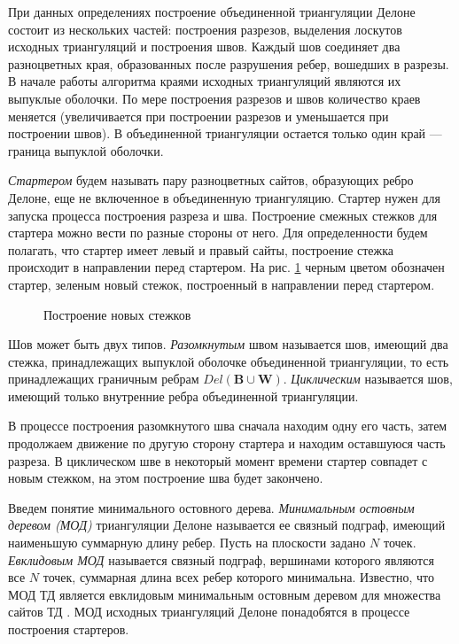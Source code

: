 \documentclass[12pt]{article}
\begin{document}
При данных определениях построение объединенной триангуляции Делоне состоит из нескольких частей: построения разрезов,
выделения лоскутов исходных триангуляций и построения швов.
Каждый шов соединяет два разноцветных края, образованных после разрушения ребер, вошедших в разрезы.
В начале работы алгоритма краями исходных триангуляций являются их выпуклые оболочки.
По мере построения разрезов и швов количество краев меняется
(увеличивается при построении разрезов и уменьшается при построении швов).
В объединенной триангуляции остается только один край --- граница выпуклой оболочки.

{\itshape Стартером} будем называть пару разноцветных сайтов, образующих ребро Делоне,
еще не включенное в объединенную триангуляцию.
Стартер нужен для запуска процесса построения разреза и шва.
Построение смежных стежков для стартера можно вести по разные стороны от него.
Для определенности будем полагать, что стартер имеет левый и правый сайты,
построение стежка происходит в направлении перед стартером.
На рис. \ref{pic:dir} черным цветом обозначен стартер, зеленым новый стежок, построенный в направлении перед стартером.

\begin{figure}[htb!]
	\caption{Построение новых стежков}
	\label{pic:dir}
\end{figure}

Шов может быть двух типов.
{\itshape Разомкнутым} швом называется шов, имеющий два стежка, принадлежащих выпуклой оболочке объединенной триангуляции,
то есть принадлежащих граничным ребрам $Del(\textbf{B} \cup \textbf{W})$.
{\itshape Циклическим} называется шов, имеющий только внутренние ребра объединенной триангуляции.

В процессе построения разомкнутого шва сначала находим одну его часть,
затем продолжаем движение по другую сторону стартера и находим оставшуюся часть разреза.
В циклическом шве в некоторый момент времени стартер совпадет с новым стежком,
на этом построение шва будет закончено.

Введем понятие минимального остовного дерева.
{\itshape Минимальным остовным деревом (МОД)} триангуляции Делоне называется ее связный подграф,
имеющий наименьшую суммарную длину ребер.
Пусть на плоскости задано $N$ точек.
{\itshape Евклидовым МОД} называется связный подграф, вершинами которого являются все $N$ точек, суммарная длина всех ребер которого минимальна.
Известно, что МОД ТД является евклидовым минимальным остовным деревом для множества сайтов ТД \cite[стр. 229, 277]{Preparata}.
МОД исходных триангуляций Делоне понадобятся в процессе построения стартеров.
\end{document}
